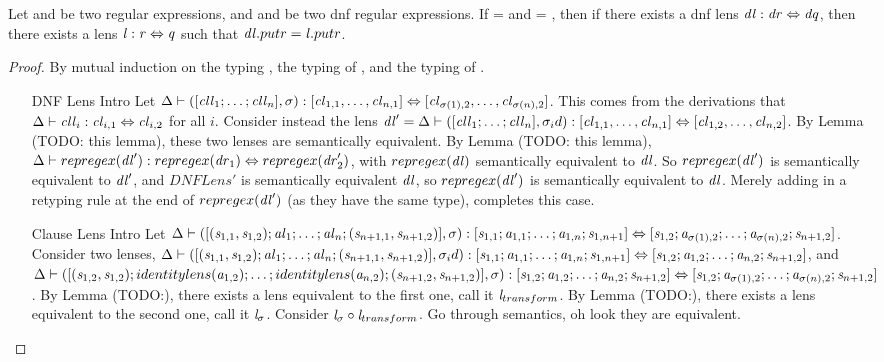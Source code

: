 \begin{theorem}[Soundness]
Let \Regex{} and \RegexAlt{} be two regular expressions, and \DNFRegex{} and \DNFRegexAlt{} be two dnf regular expressions.
If \LanguageOf{\Delta}{\Regex{}} = \LanguageOf{\Delta}{\DNFRegex{}} and \LanguageOf{\Delta}{\RegexAlt} = \LanguageOf{\Delta}{\DNFRegexAlt{}},
then if there exists a dnf lens $\mathit{dl} : \mathit{dr} \Leftrightarrow \mathit{dq}$,
then there exists a lens $\mathit{l} : \mathit{r} \Leftrightarrow \mathit{q}$ such that
$\mathit{dl}.putr = \mathit{l}.putr$.
\begin{proof}
By mutual induction on the typing \DNFLens{}, the typing of \ClauseLens{}, and the typing of \AtomLens{}.
\begin{enumerate}
\item[DNF Lens Intro] Let $\Delta \vdash ([\mathit{cll}_1 ; \ldots ; \mathit{cll}_n],\sigma) : [\mathit{cl}_{1,1}, \ldots, \mathit{cl}_{n,1}] \Leftrightarrow [\mathit{cl}_{\sigma(1),2}, \ldots, \mathit{cl}_{\sigma(n),2}]$.
This comes from the derivations that $\Delta \vdash \mathit{cll}_i : \mathit{cl}_{i,1} \Leftrightarrow \mathit{cl}_{i,2}$ for all $i$.
Consider instead the lens $\mathit{dl}' = \Delta \vdash ([\mathit{cll}_1 ; \ldots ; \mathit{cll}_n],\sigma_id) : [\mathit{cl}_{1,1}, \ldots, \mathit{cl}_{n,1}] \Leftrightarrow[\mathit{cl}_{1,2}, \ldots, \mathit{cl}_{n,2}]$.
By Lemma (TODO: this lemma), these two lenses are semantically equivalent.
By Lemma (TODO: this lemma), $\Delta \vdash repregex(\mathit{dl}') : repregex(\mathit{dr}_1) \Leftrightarrow repregex(\mathit{dr}_2')$, with $repregex(\mathit{dl})$ semantically equivalent to $\mathit{dl}$.
So $repregex(\mathit{dl}')$ is semantically equivalent to $\mathit{dl}'$, and $DNFLens'$ is semantically equivalent $\mathit{dl}$, so $repregex(\mathit{dl}')$ is
semantically equivalent to $\mathit{dl}$.  Merely adding in a retyping rule at
the end of $repregex(\mathit{dl}')$ (as they have the same type), completes this case.
\item[Clause Lens Intro] Let $\Delta \vdash ([(\mathit{s}_{1,1},\mathit{s}_{1,2}) ; \mathit{al}_1 ; \ldots ; \mathit{al}_n ; (\mathit{s}_{n+1,1},\mathit{s}_{n+1,2})],\sigma) : [\mathit{s}_{1,1};\mathit{a}_{1,1}; \ldots ; \mathit{a}_{1,n} ; \mathit{s}_{1,n+1}] \Leftrightarrow [\mathit{s}_{1,2};\mathit{a}_{\sigma(1),2}; \ldots ; \mathit{a}_{\sigma(n),2} ; \mathit{s}_{n+1,2}]$.
Consider two lenses, $\Delta \vdash ([(\mathit{s}_{1,1},\mathit{s}_{1,2}) ; \mathit{al}_1 ; \ldots ; \mathit{al}_n ; (\mathit{s}_{n+1,1},\mathit{s}_{n+1,2})],\sigma_id) : [\mathit{s}_{1,1};\mathit{a}_{1,1}; \ldots ; \mathit{a}_{1,n} ; \mathit{s}_{1,n+1}] \Leftrightarrow [\mathit{s}_{1,2};\mathit{a}_{1,2}; \ldots ; \mathit{a}_{n,2} ; \mathit{s}_{n+1,2}]$,
and $\Delta \vdash ([(\mathit{s}_{1,2},\mathit{s}_{1,2});identitylens(\mathit{a}_{1,2}); \ldots ; identitylens(\mathit{a}_{n,2}) ; (\mathit{s}_{n+1,2},\mathit{s}_{n+1,2})],\sigma) : [\mathit{s}_{1,2};\mathit{a}_{1,2}; \ldots ; \mathit{a}_{n,2} ; \mathit{s}_{n+1,2}] \Leftrightarrow [\mathit{s}_{1,2};\mathit{a}_{\sigma(1),2}; \ldots ; \mathit{a}_{\sigma(n),2} ; \mathit{s}_{n+1,2}]$.
By Lemma (TODO:), there exists a lens equivalent to the first one, call it $\mathit{l}_{transform}$.
By Lemma (TODO:), there exists a lens equivalent to the second one, call it $\mathit{l}_{\sigma}$.
Consider $\mathit{l}_{\sigma} \circ \mathit{l}_{transform}$.  Go through semantics, oh look they are equivalent.


\end{enumerate}
\end{proof}
\end{theorem}
